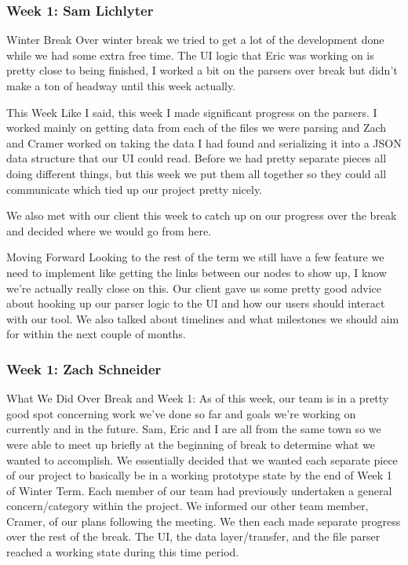 \subsubsection{Week 1: Sam Lichlyter}

Winter Break
Over winter break we tried to get a lot of the development done while we had some extra free time. The UI logic that Eric was working on is pretty close to being finished, I worked a bit on the parsers over break but didn't make a ton of headway until this week actually. 

This Week
Like I said, this week I made significant progress on the parsers. I worked mainly on getting data from each of the files we were parsing and Zach and Cramer worked on taking the data I had found and serializing it into a JSON data structure that our UI could read. Before we had pretty separate pieces all doing different things, but this week we put them all together so they could all communicate which tied up our project pretty nicely. 

We also met with our client this week to catch up on our progress over the break and decided where we would go from here.

Moving Forward
Looking to the rest of the term we still have a few feature we need to implement like getting the links between our nodes to show up, I know we're actually really close on this. Our client gave us some pretty good advice about hooking up our parser logic to the UI and how our users should interact with our tool. We also talked about timelines and what milestones we should aim for within the next couple of months.

\subsubsection{Week 1: Zach Schneider}

What We Did Over Break and Week 1:
As of this week, our team is in a pretty good spot concerning work we've done so far and goals we're working on currently and in the future. Sam, Eric and I are all from the same town so we were able to meet up briefly at the beginning of break to determine what we wanted to accomplish. We essentially decided that we wanted each separate piece of our project to basically be in a working prototype state by the end of Week 1 of Winter Term. Each member of our team had previously undertaken a general concern/category within the project. We informed our other team member, Cramer, of our plans following the meeting. We then each made separate progress over the rest of the break. The UI, the data layer/transfer, and the file parser reached a working state during this time period.

